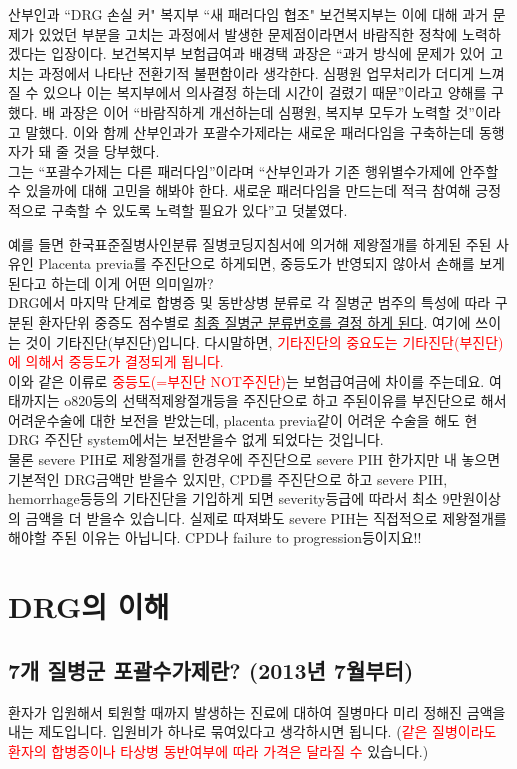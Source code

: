 \begin{hemphsentense}{산부인과 ``DRG 손실 커" 복지부 ``새 패러다임 협조"}
보건복지부는 이에 대해 과거 문제가 있었던 부분을 고치는 과정에서 발생한 문제점이라면서 바람직한 정착에 노력하겠다는 입장이다. 보건복지부 보험급여과 배경택 과장은 “과거 방식에 문제가 있어 고치는 과정에서 나타난 전환기적 불편함이라 생각한다. 심평원 업무처리가 더디게 느껴질 수 있으나 이는 복지부에서 의사결정 하는데 시간이 걸렸기 때문”이라고 양해를 구했다. 배 과장은 이어 “바람직하게 개선하는데 심평원, 복지부 모두가 노력할 것”이라고 말했다. 이와 함께 산부인과가 포괄수가제라는 새로운 패러다임을 구축하는데 동행자가 돼 줄 것을 당부했다.\\
그는 “포괄수가제는 다른 패러다임”이라며 “산부인과가 기존 행위별수가제에 안주할 수 있을까에 대해 고민을 해봐야 한다. 새로운 패러다임을 만드는데 적극 참여해 긍정적으로 구축할 수 있도록 노력할 필요가 있다”고 덧붙였다.
\end{hemphsentense}
예를 들면 한국표준질병사인분류 질병코딩지침서에 의거해 제왕절개를 하게된 주된 사유인 Placenta previa를 주진단으로 하게되면, 중등도가 반영되지 않아서 손해를 보게된다고 하는데 이게 어떤 의미일까? \\ DRG에서 마지막 단계로 합병증 및 동반상병 분류로 각 질병군 범주의 특성에 따라 구분된 환자단위 중증도 점수별로 \uline{최종 질병군 분류번호를 결정 하게 된다}. 여기에 쓰이는 것이 기타진단(부진단)입니다. 다시말하면, \textcolor{red}{기타진단의 중요도는 기타진단(부진단)에 의해서 중등도가 결정되게 됩니다.}\\
이와 같은 이류로 \textcolor{red}{중등도(=부진단 NOT주진단)}는 보험급여금에 차이를 주는데요. 여태까지는 o820등의 선택적제왕절개등을 주진단으로 하고 주된이유를 부진단으로 해서 어려운수술에 대한 보전을 받았는데, placenta previa같이 어려운 수술을 해도 현 DRG 주진단 system에서는 보전받을수 없게 되었다는 것입니다. \\
물론 severe PIH로 제왕절개를 한경우에 주진단으로 severe PIH 한가지만 내 놓으면 기본적인 DRG금액만 받을수 있지만, CPD를 주진단으로 하고 severe PIH, hemorrhage등등의 기타진단을 기입하게 되면 severity등급에 따라서 최소 9만원이상의 금액을 더 받을수 있습니다. 실제로 따져봐도 severe PIH는 직접적으로 제왕절개를 해야할 주된 이유는 아닙니다. CPD나 failure to progression등이지요!!\\
\clearpage

\section{DRG의 이해}
\subsection{7개 질병군 포괄수가제란? (2013년 7월부터)}
환자가 입원해서 퇴원할 때까지 발생하는 진료에 대하여 질병마다 미리 정해진 금액을 내는 제도입니다. 입원비가 하나로 묶여있다고 생각하시면 됩니다. (\textcolor{red}{같은 질병이라도 환자의 합병증이나 타상병 동반여부에 따라 가격은 달라질 수} 있습니다.)\\

